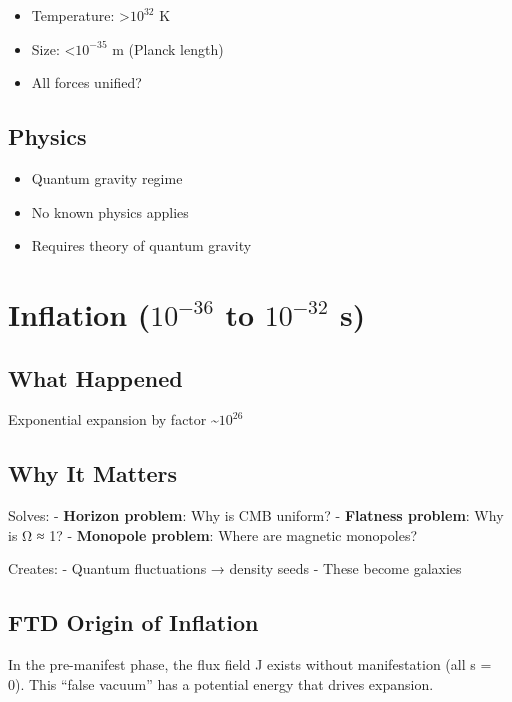\documentclass[
  11pt,
  letterpaper,
  twoside,
  openright]{book}
\providecommand{\tightlist}{%
  \setlength{\itemsep}{0pt}\setlength{\parskip}{0pt}}
\begin{document}
\begin{itemize}
\tightlist
\item
  Temperature: \textgreater{}\(10^{32}\) K
\item
  Size: \textless{}\(10^{-35}\) m (Planck length)
\item
  All forces unified?
\end{itemize}

\subsection{Physics}\label{physics}

\begin{itemize}
\tightlist
\item
  Quantum gravity regime
\item
  No known physics applies
\item
  Requires theory of quantum gravity
\end{itemize}

\section{\texorpdfstring{Inflation (\(10^{-36}\) to \(10^{-32}\)
s)}{Inflation (10\^{}\{-36\} to 10\^{}\{-32\} s)}}\label{inflation-10-36-to-10-32-s}

\subsection{What Happened}\label{what-happened}

Exponential expansion by factor \textasciitilde{}\(10^{26}\)

\subsection{Why It Matters}\label{why-it-matters}

Solves: - \textbf{Horizon problem}: Why is CMB uniform? -
\textbf{Flatness problem}: Why is Ω ≈ 1? - \textbf{Monopole problem}:
Where are magnetic monopoles?

Creates: - Quantum fluctuations → density seeds - These become galaxies

\subsection{FTD Origin of Inflation}\label{ftd-origin-of-inflation}

In the pre-manifest phase, the flux field J exists without manifestation
(all s = 0). This ``false vacuum'' has a potential energy that drives
expansion.
\end{document}
